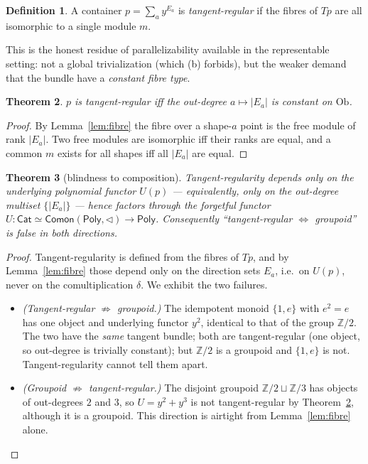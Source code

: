 \documentclass[11pt]{article}
\newtheorem{theorem}{Theorem}
\theoremstyle{definition}
\newtheorem{definition}[theorem]{Definition}
\newcommand{\Poly}{\mathsf{Poly}}
\newcommand{\Cat}{\mathsf{Cat}}
\newcommand{\Comon}{\mathsf{Comon}}
\newcommand{\Ob}{\mathrm{Ob}}
\newcommand{\Z}{\mathbb{Z}}
\begin{document}
\begin{definition}\label{def:treg}
A container $p=\sum_a y^{E_a}$ is \emph{tangent-regular} if the fibres of $Tp$ are all isomorphic
to a single module $m$.
\end{definition}

This is the honest residue of parallelizability available in the representable setting: not a
global trivialization (which (b) forbids), but the weaker demand that the bundle have a
\emph{constant fibre type}.

\begin{theorem}\label{thm:treg}
$p$ is tangent-regular iff the out-degree $a\mapsto|E_a|$ is constant on $\Ob$.
\end{theorem}

\begin{proof}
By Lemma~\ref{lem:fibre} the fibre over a shape-$a$ point is the free module of rank $|E_a|$. Two
free modules are isomorphic iff their ranks are equal, and a common $m$ exists for all shapes iff
all $|E_a|$ are equal.
\end{proof}

\begin{theorem}[blindness to composition]\label{thm:blind}
Tangent-regularity depends only on the underlying polynomial functor $U(p)$ --- equivalently, only
on the out-degree multiset $\{|E_a|\}$ --- hence factors through the forgetful functor
$U\colon\Cat\simeq\Comon(\Poly,\lhd)\to\Poly$. Consequently ``tangent-regular $\Leftrightarrow$
groupoid'' is false in both directions.
\end{theorem}

\begin{proof}
Tangent-regularity is defined from the fibres of $Tp$, and by Lemma~\ref{lem:fibre} those depend
only on the direction sets $E_a$, i.e.\ on $U(p)$, never on the comultiplication $\delta$. We
exhibit the two failures.
\begin{itemize}
\item \emph{(Tangent-regular $\not\Rightarrow$ groupoid.)} The idempotent monoid $\{1,e\}$ with
$e^2=e$ has one object and underlying functor $y^2$, identical to that of the group $\Z/2$. The two
have the \emph{same} tangent bundle; both are tangent-regular (one object, so out-degree is
trivially constant); but $\Z/2$ is a groupoid and $\{1,e\}$ is not. Tangent-regularity cannot tell
them apart.
\item \emph{(Groupoid $\not\Rightarrow$ tangent-regular.)} The disjoint groupoid
$\Z/2\sqcup\Z/3$ has objects of out-degrees $2$ and $3$, so $U=y^2+y^3$ is not tangent-regular by
Theorem~\ref{thm:treg}, although it is a groupoid. This direction is airtight from
Lemma~\ref{lem:fibre} alone.
\end{itemize}
\end{proof}
\end{document}
